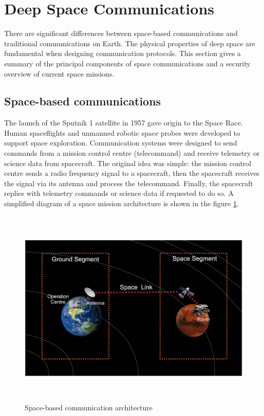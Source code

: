 \section{Deep Space Communications}
\label{sec:space}

There are significant differences between space-based communications and traditional communications on Earth. The physical properties of deep space are fundamental when designing communication protocols. This section gives a summary of the principal components of space communications and a security overview of current space missions. 


\subsection{Space-based communications}

The launch of the Sputnik 1 satellite in 1957 gave origin to the Space Race. Human spaceflights and unmanned robotic space probes were developed to support space exploration. Communication systems were designed to send commands from a mission control centre (telecommand) and receive telemetry or science data from spacecraft. The original idea was simple: the mission control centre sends a radio frequency signal to a spacecraft, then the spacecraft receives the signal via its antenna and process the telecommand. Finally, the spacecraft replies with telemetry commands or science data if requested to do so. A simplified diagram of a space mission architecture is shown in the figure \ref{fig:space-based-arc}.  



\begin{figure}[hbt]
\centering
\includegraphics[width=1 \linewidth, height=9.5cm]{images/ground.png} 
\caption{Space-based communication architecture}
\label{fig:space-based-arc}
\end{figure}


